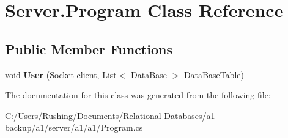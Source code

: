 \hypertarget{class_server_1_1_program}{}\section{Server.\+Program Class Reference}
\label{class_server_1_1_program}
\subsection*{Public Member Functions}
\begin{DoxyCompactItemize}
\item 
\mbox{\label{class_server_1_1_program_aae7ead2c799cb8fff540659592212a0d}} 
void {\bfseries User} (Socket client, List$<$ \mbox{\hyperlink{class_server_1_1_data_base}{Data\+Base}} $>$ Data\+Base\+Table)
\end{DoxyCompactItemize}


The documentation for this class was generated from the following file\+:\begin{DoxyCompactItemize}
\item 
C\+:/\+Users/\+Rushing/\+Documents/\+Relational Databases/a1 -\/ backup/a1/server/a1/a1/Program.\+cs\end{DoxyCompactItemize}
